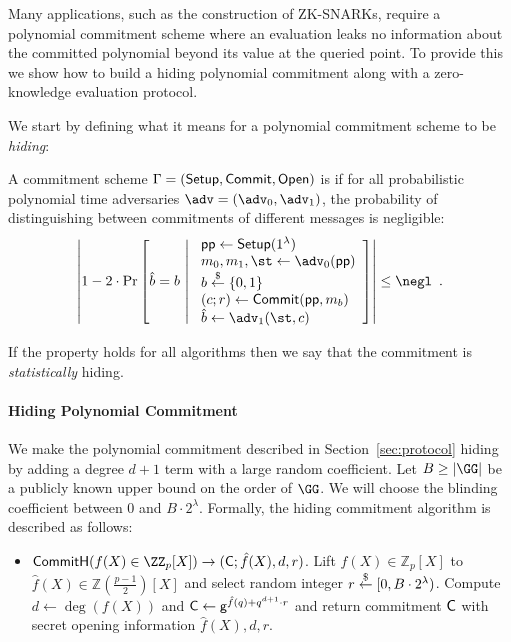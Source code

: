 Many applications, such as the construction of ZK-SNARKs, require a polynomial commitment scheme where an evaluation leaks no information about the committed polynomial beyond its value at the queried point. To provide this we show how to build a hiding polynomial commitment along with a zero-knowledge evaluation protocol.

We start by defining what it means for a polynomial commitment scheme to be \emph{hiding}:

\begin{definition}
A commitment scheme $\Gamma = (\textsf{{Setup}}, \textsf{{Commit}}, \textsf{{Open}})$ is  if for all probabilistic polynomial time adversaries $\adv = (\adv_0, \adv_1)$, the probability of distinguishing between commitments of different messages is negligible:
\[
	\left| 1 - 2 \cdot \mathrm{Pr}\left[
		\hat{b} = b \ \middle| \ 
		\begin{array}{l}
			\params \gets \pro{Setup}(1^\lambda) \\
			m_0, m_1, \st \gets \adv_0(\params) \\
			b \sample \{0,1\} \\
			(c; r) \gets \pro{Commit}(\params, m_b) \\
			\hat{b} \gets \adv_1(\st, c)
		\end{array}
	\right] \right| \leq \negl \enspace .
\]
\end{definition}
If the property holds for all algorithms then we say that the commitment is \emph{statistically} hiding.
\paragraph{Hiding Polynomial Commitment}
We make the polynomial commitment described in Section~\ref{sec:protocol} hiding by adding a degree $d+1$ term with a large random coefficient. Let $B\geq |\GG|$ be a publicly known upper bound on the order of $\GG$. We will choose the blinding coefficient between $0$ and $B\cdot 2^\lambda$. Formally, the hiding commitment algorithm is described as follows:
\begin{itemize}
	\item $\pro{CommitH}(f(X) \in \ZZ_p[X]) \rightarrow (\gr{C}; \hat{f}(X), d, r)$. Lift $f(X) \in \mathbb{Z}_p[X]$ to $\hat{f}(X) \in \mathbb{Z}(\frac{p-1}{2})[X]$ and select random integer $r \overset{\$}{\gets} [0,B\cdot 2^\lambda)$. Compute $d \gets \deg(f(X))$ and $\mathsf{C} \gets \mathsf{g}^{\hat{f}(q)+q^{d+1} \cdot r}$ and return commitment $\mathsf{C}$ with secret opening information $\hat{f}(X), d, r$.
\end{itemize}


